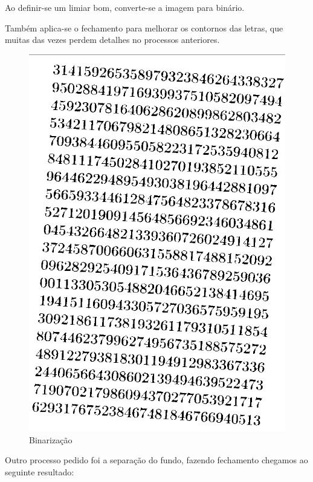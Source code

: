 \documentclass[conference]{IEEEtran}
\begin{document}
Ao definir-se um limiar bom, converte-se a imagem para binário.

Também aplica-se o fechamento para melhorar os contornos das letras, que muitas
das vezes perdem detalhes no processos anteriores.
\begin{figure}[h]
    \centering
    \includegraphics[scale=0.30]{data/binario1certo.png}
    \caption{Binarização}
    \label{fig3}
\end{figure}

Outro processo pedido foi a separação do fundo, fazendo fechamento chegamos ao seguinte
resultado:
\end{document}
